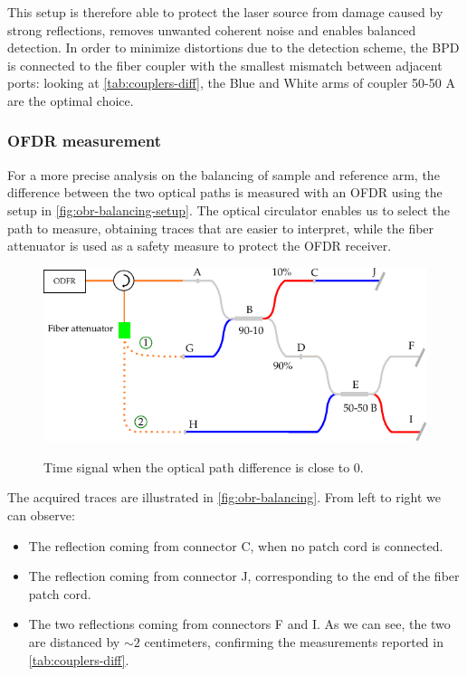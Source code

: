 This setup is therefore able to protect the laser source from damage caused by strong reflections, removes unwanted coherent noise and enables balanced detection. In order to minimize distortions due to the detection scheme, the BPD is connected to the fiber coupler with the smallest mismatch between adjacent ports: looking at \autoref{tab:couplers-diff}, the Blue and White arms of coupler 50-50 A are the optimal choice. 

\subsubsection{OFDR measurement}

For a more precise analysis on the balancing of sample and reference arm, the difference between the two optical paths is measured with an OFDR using the setup in \autoref{fig:obr-balancing-setup}. The optical circulator enables us to select the path to measure, obtaining traces that are easier to interpret, while the fiber attenuator is used as a safety measure to protect the OFDR receiver. 

\begin{figure}[tb]
	\myfloatalign
	{	\includegraphics[width=\linewidth]{gfx/ch3/obr-balancing-setup}}
	\caption{Time signal when the optical path difference is close to 0.}\label{fig:obr-balancing-setup}
\end{figure}

The acquired traces are illustrated in \autoref{fig:obr-balancing}. From left to right we can observe:
\begin{itemize}
	
	\item The reflection coming from connector C, when no patch cord is connected.
	\item The reflection coming from connector J, corresponding to the end of the fiber patch cord. 
	
	\item The two reflections coming from connectors F and I. As we can see, the two are distanced by $\sim 2$ centimeters, confirming the measurements reported in \autoref{tab:couplers-diff}. 
\end{itemize}


